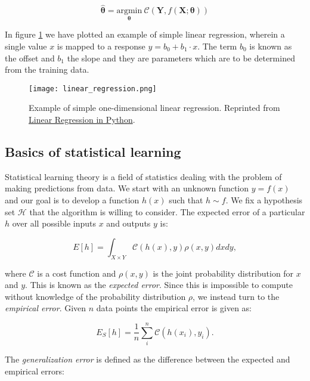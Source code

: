 \begin{equation}
\hat{\bm{\theta}} = \underset{\bm{\theta}}
{\text{argmin}} \ \mathcal{C}(\bm{Y}, f(\bm{X} ; \bm{\theta}))
\end{equation}

In figure \ref{fig:linear-regression} we have plotted an example
of simple linear regression, wherein a single value $x$ is mapped
to a response $y = b_0 + b_1 \cdot x$. The term $b_0$ is known
as the offset and $b_1$ the slope and they are parameters which
are to be determined from the training data.

\begin{figure}[H]
    \centering
    \texttt{[image: linear\_regression.png]}
    \caption{Example of simple one-dimensional linear regression.
        Reprinted from \href{https://realpython.com/linear-regression-in-python/}
        {Linear Regression in Python}.}
    \label{fig:linear-regression}
\end{figure}

\subsection{Basics of statistical learning}
Statistical learning theory is a field of statistics dealing with the problem
of making predictions from data. We start with an unknown function \newline
$y = f(x)$ and our goal is to develop a function $h(x)$
such that $h \sim f$. We fix a hypothesis set $\mathcal{H}$ that the
algorithm is willing to consider. The expected error of a particular $h$
over all possible inputs $x$ and outputs $y$ is:

\begin{equation}
 E[h] = \int_{X \times Y} \mathcal{C}(h(x), y) \rho(x,y) dx dy ,
\end{equation}

where $\mathcal{C}$ is a cost function and $\rho(x,y)$ is the joint probability
distribution for $x$ and $y$. This is known as the \textit{expected error}.
Since this is impossible to compute without knowledge of the probability distribution
$\rho$, we instead turn to the \textit{empirical error}. Given $n$ data points
the empirical error is given as:

\begin{equation}
 E_S[h] = \frac{1}{n} \sum_i^n \mathcal{C}(h(x_i), y_i) .
\end{equation}

The \textit{generalization error} is defined as the difference
between the expected and empirical errors:


